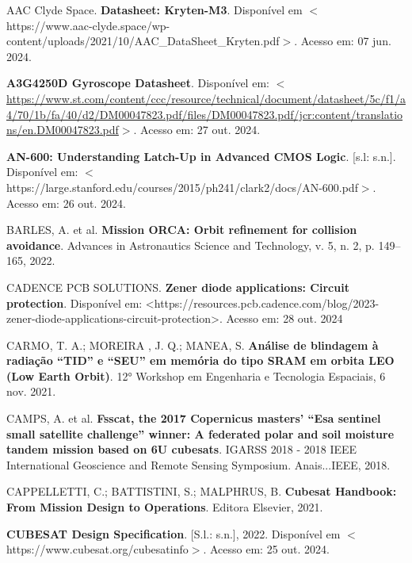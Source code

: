 \begin{flushleft}
\begin{thebibliography}{00} %
 AAC Clyde Space. \textbf{Datasheet: Kryten-M3}. Disponível em $<$https://www.aac-clyde.space/wp-content/uploads/2021/10/AAC\_DataSheet\_Kryten.pdf$>$.  Acesso em: 07 jun. 2024.

 \textbf{A3G4250D Gyroscope Datasheet}. Disponível em: $<$\url{https://www.st.com/content/ccc/resource/technical/document/datasheet/5c/f1/a4/70/1b/fa/40/d2/DM00047823.pdf/files/DM00047823.pdf/jcr:content/translations/en.DM00047823.pdf}$>$. Acesso em: 27 out. 2024. 

 \textbf{AN-600: Understanding Latch-Up in Advanced CMOS Logic}. [s.l: s.n.]. Disponível em: $<$https://large.stanford.edu/courses/2015/ph241/clark2/docs/AN-600.pdf$>$. Acesso em: 26 out. 2024.

 BARLES, A. et al. \textbf{Mission ORCA: Orbit refinement for collision avoidance}. Advances in Astronautics Science and Technology, v. 5, n. 2, p. 149–165, 2022.


 CADENCE PCB SOLUTIONS. \textbf{Zener diode applications: Circuit protection}. Disponível em: <https://resources.pcb.cadence.com/blog/2023-zener-diode-applications-circuit-protection>. Acesso em: 28 out. 2024

 CARMO, T. A.; MOREIRA , J. Q.; MANEA, S. \textbf{Análise de blindagem à radiação “TID” e “SEU” em memória do tipo SRAM em orbita LEO (Low Earth Orbit)}. 12° Workshop em Engenharia e Tecnologia Espaciais, 6 nov. 2021.

 CAMPS, A. et al. \textbf{Fsscat, the 2017 Copernicus masters’ “Esa sentinel small satellite challenge” winner: A federated polar and soil moisture tandem mission based on 6U cubesats}. IGARSS 2018 - 2018 IEEE International Geoscience and Remote Sensing Symposium. Anais...IEEE, 2018.

 CAPPELLETTI, C.; BATTISTINI, S.; MALPHRUS, B. \textbf{Cubesat Handbook: From Mission Design to Operations}. Editora Elsevier, 2021.

 \textbf{CUBESAT Design Specification}. [S.l.: s.n.], 2022. Disponível em $<$https://www.cubesat.org/cubesatinfo$>$. Acesso em: 25 out. 2024.


\end{thebibliography}
\end{flushleft}
